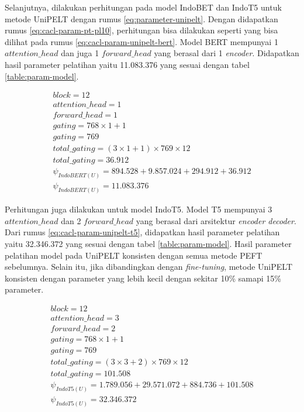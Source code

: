 Selanjutnya, dilakukan perhitungan pada model IndoBET dan IndoT5 untuk metode UniPELT dengan rumus \ref{eq:parameter-unipelt}. Dengan didapatkan rumus \ref{eq:cacl-param-pt-pl10}, perhitungan bisa dilakukan seperti yang bisa dilihat pada rumus \ref{eq:cacl-param-unipelt-bert}. Model BERT mempunyai 1 $attention\_head$ dan juga 1 $forward\_head$ yang berasal dari 1 \textit{encoder}. Didapatkan hasil parameter pelatihan yaitu 11.083.376 yang sesuai dengan tabel \ref{table:param-model}.

\begin{equation}
    \begin{aligned}
        block = 12 \\
        attention\_head = 1 \\
        forward\_head = 1 \\
        gating = 768 \times 1 + 1 \\
        gating = 769 \\
        total\_gating = (3 \times 1 + 1) \times 769 \times 12 \\
        total\_gating = 36.912 \\
        \psi_{IndoBERT(U)} = 894.528 + 9.857.024 + 294.912 + 36.912 \\
        \psi_{IndoBERT(U)} = 11.083.376
    \end{aligned}
    \label{eq:cacl-param-unipelt-bert}
\end{equation}

Perhitungan juga dilakukan untuk model IndoT5. Model T5 mempunyai 3 $attention\_head$ dan 2 $forward\_head$ yang berasal dari arsitektur \textit{encoder decoder}. Dari rumus \ref{eq:cacl-param-unipelt-t5}, didapatkan hasil parameter pelatihan yaitu 32.346.372 yang sesuai dengan tabel \ref{table:param-model}. Hasil parameter pelatihan model pada UniPELT konsisten dengan semua metode PEFT sebelumnya. Selain itu, jika dibandingkan dengan \textit{fine-tuning}, metode UniPELT konsisten dengan parameter yang lebih kecil dengan sekitar 10\% samapi 15\% parameter.

\begin{equation}
    \begin{aligned}
        block = 12 \\
        attention\_head = 3 \\
        forward\_head = 2 \\
        gating = 768 \times 1 + 1 \\
        gating = 769 \\
        total\_gating = (3 \times 3 + 2) \times 769 \times 12 \\
        total\_gating =  101.508 \\
        \psi_{IndoT5(U)} = 1.789.056 + 29.571.072 + 884.736 + 101.508 \\
        \psi_{IndoT5(U)} = 32.346.372 \\
    \end{aligned}
    \label{eq:cacl-param-unipelt-t5}
\end{equation}
